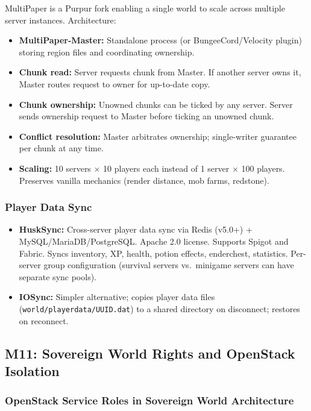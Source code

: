 \documentclass[11pt,letterpaper]{article}
\begin{document}
MultiPaper is a Purpur fork enabling a single world to scale across multiple server instances. Architecture:
\begin{itemize}[leftmargin=2em]
  \item \textbf{MultiPaper-Master:} Standalone process (or BungeeCord/Velocity plugin) storing region files and coordinating ownership.
  \item \textbf{Chunk read:} Server requests chunk from Master. If another server owns it, Master routes request to owner for up-to-date copy.
  \item \textbf{Chunk ownership:} Unowned chunks can be ticked by any server. Server sends ownership request to Master before ticking an unowned chunk.
  \item \textbf{Conflict resolution:} Master arbitrates ownership; single-writer guarantee per chunk at any time.
  \item \textbf{Scaling:} 10 servers × 10 players each instead of 1 server × 100 players. Preserves vanilla mechanics (render distance, mob farms, redstone).
\end{itemize}

\subsubsection{Player Data Sync}

\begin{itemize}[leftmargin=2em]
  \item \textbf{HuskSync:} Cross-server player data sync via Redis (v5.0+) + MySQL/MariaDB/PostgreSQL. Apache 2.0 license. Supports Spigot and Fabric. Syncs inventory, XP, health, potion effects, enderchest, statistics. Per-server group configuration (survival servers vs.\ minigame servers can have separate sync pools).
  \item \textbf{IOSync:} Simpler alternative; copies player data files (\texttt{world/playerdata/UUID.dat}) to a shared directory on disconnect; restores on reconnect.
\end{itemize}

\subsection{M11: Sovereign World Rights and OpenStack Isolation}

\subsubsection{OpenStack Service Roles in Sovereign World Architecture}
\end{document}
